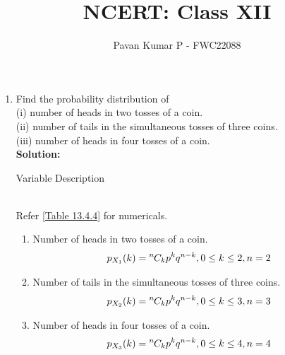 \documentclass{article}
\newcommand{\solution}{\noindent \textbf{Solution: }}
\newcommand*{\permcomb}[4][0mu]{{{}^{#3}\mkern#1#2_{#4}}}
\newcommand*{\comb}[1][-1mu]{\permcomb[#1]{C}}
\begin{document}
\title{NCERT: Class XII}
\author{\Large Pavan Kumar P - FWC22088}
\date{}

\maketitle

\begin{enumerate}[label=13.\arabic{enumi}.\arabic{enumii}]

\setcounter{enumi}{3}
\setcounter{enumii}{4}

\item Find the probability distribution of\\
(i) number of heads in two tosses of a coin.\\
(ii) number of tails in the simultaneous tosses of three coins.\\
(iii) number of heads in four tosses of a coin.\\[1ex]
\solution
\begin{table}[h]
 \centering
	
	\caption{Variable Description }
	\label{Table 13.4.4}
\end{table}\\
 Refer \ref{Table 13.4.4} for numericals.
\begin{enumerate} 
\item Number of heads in two tosses of a coin.
 \begin{align}
  p_{X_1}(k) &= \comb{n}{k}p^{k}q^{n-k},  0\leq k\leq 2,n=2
\end{align}

\item Number of tails in the simultaneous tosses of three coins.
 \begin{align}
  p_{X_2}(k) &= \comb{n}{k}p^{k}q^{n-k},  0\leq k\leq 3,n=3 
\end{align}

\item Number of heads in four tosses of a coin.
 \begin{align}
  p_{X_3}(k) &= \comb{n}{k}p^{k}q^{n-k},  0\leq k\leq 4,n=4
\end{align}

\end{enumerate}
\end{enumerate}
\end{document}
